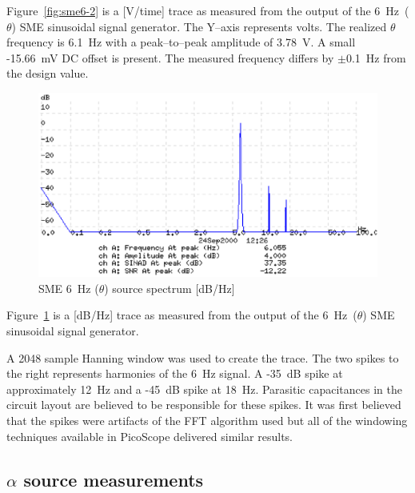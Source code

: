 Figure~\ref{fig:sme6-2} is a [V/time] trace as measured from the
output of the 6~Hz~($\theta$) SME sinusoidal signal generator. The
Y--axis represents volts. The realized $\theta$ frequency is 6.1~Hz
with a peak--to--peak amplitude of 3.78~V. A small -15.66~mV DC offset
is present. The measured frequency differs by $\pm$0.1~Hz from the
design value.

\begin{figure}[htbp]
\begin{center}
	\includegraphics[width=\textwidth]{SME61.ps}
    \caption{SME 6~Hz ($\theta$) source spectrum [dB/Hz]}
    \label{fig:sme6-1}
\end{center}
\end{figure}


Figure~\ref{fig:sme6-1} is a [dB/Hz] trace as measured from the output
of the 6~Hz~($\theta$) SME sinusoidal signal generator.

A 2048 sample Hanning window was used to create the trace. The two
spikes to the right represents harmonies of the 6~Hz signal. A -35~dB
spike at approximately 12~Hz and a -45~dB spike at 18~Hz. Parasitic
capacitances in the circuit layout are believed to be responsible for
these spikes. It was first believed that the spikes were artifacts of
the FFT algorithm used but all of the windowing techniques available
in PicoScope delivered similar results.

\subsection{$\alpha$ source measurements}

